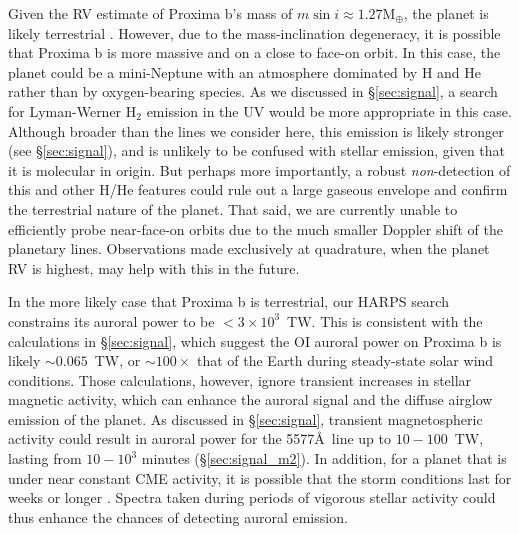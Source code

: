\documentclass{emulateapj}
\begin{document}
Given the RV estimate of Proxima b's mass of $m {\sin} i \approx 1.27\mathrm{M_\oplus}$, the planet is likely terrestrial \citep{Anglada-Escude2016}. However, due to the mass-inclination degeneracy, it is possible that Proxima b is more massive and on a close to face-on orbit.  In this case, the planet could be a mini-Neptune with an atmosphere dominated by H and He rather than by oxygen-bearing species. As we discussed in \S\ref{sec:signal}, a search for Lyman-Werner H$_2$ emission in the UV would be more appropriate in this case. Although broader than the lines we consider here, this emission is likely stronger (see \S\ref{sec:signal}), and is unlikely to be confused with stellar emission, given that it is molecular in origin. But perhaps more importantly, a robust \textit{non}-detection of this and other H/He features could rule out a large gaseous envelope and confirm the terrestrial nature of the planet. That said, we are currently unable to efficiently probe near-face-on orbits due to the much smaller Doppler shift of the planetary lines. Observations made exclusively at quadrature, when the planet RV is highest, may help with this in the future.

In the more likely case that Proxima b is terrestrial, our HARPS search constrains its auroral power to be $< 3\times 10^{3}$~TW. This is consistent with the calculations in \S\ref{sec:signal}, which suggest the OI auroral power on Proxima b is likely ${\sim} 0.065$~TW, or ${\sim} 100\times$ that of the Earth during steady-state solar wind conditions. Those calculations, however, ignore transient increases in stellar magnetic activity, which can enhance the auroral signal and the diffuse airglow emission of the planet. As discussed in \S\ref{sec:signal}, transient magnetospheric activity could result in auroral power for the 5577\AA\ line up to $10-100$~TW, lasting from $10-10^3$ minutes (\S\ref{sec:signal_m2}).  In addition, for a planet that is under near constant CME activity, it is possible that the storm conditions last for weeks or longer \citep{Gonzalez1994,Gonzalez1999}. Spectra taken during periods of vigorous stellar activity could thus enhance the chances of detecting auroral emission.
\end{document}
